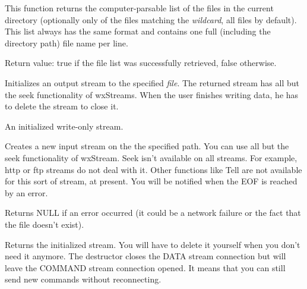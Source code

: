 \label{wxftpgetfileslist}


This function returns the computer-parsable list of the files in the current
directory (optionally only of the files matching the {\it wildcard}, all files
by default). This list always has the same format and contains one full
(including the directory path) file name per line.

Return value: true if the file list was successfully retrieved, false
otherwise.




Initializes an output stream to the specified {\it file}. The returned
stream has all but the seek functionality of wxStreams. When the user finishes
writing data, he has to delete the stream to close it.


An initialized write-only stream.




\label{wxftpgetinput}


Creates a new input stream on the the specified path. You can use all but the seek
functionality of wxStream. Seek isn't available on all streams. For example,
http or ftp streams do not deal with it. Other functions like Tell
are not available for this sort of stream, at present.
You will be notified when the EOF is reached by an error.


Returns NULL if an error occurred (it could be a network failure or the fact
that the file doesn't exist).

Returns the initialized stream. You will have to delete it yourself when you
don't need it anymore. The destructor closes the DATA stream connection but
will leave the COMMAND stream connection opened. It means that you can still
send new commands without reconnecting.

